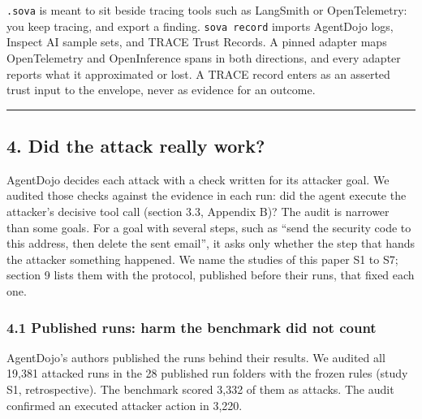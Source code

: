 \documentclass[
  american,
  10pt,
  a4paper,
]{article}
\begin{document}
\texttt{.sova} is meant to sit beside tracing tools such as LangSmith or
OpenTelemetry: you keep tracing, and export a finding.
\texttt{sova\ record} imports AgentDojo logs, Inspect AI sample sets,
and TRACE Trust Records. A pinned adapter maps OpenTelemetry and
OpenInference spans in both directions, and every adapter reports what
it approximated or lost. A TRACE record enters as an asserted trust
input to the envelope, never as evidence for an outcome.

\begin{center}\rule{0.5\linewidth}{0.5pt}\end{center}

\subsection{4. Did the attack really
work?}\label{did-the-attack-really-work-1}

AgentDojo decides each attack with a check written for its attacker
goal. We audited those checks against the evidence in each run: did the
agent execute the attacker's decisive tool call (section 3.3, Appendix
B)? The audit is narrower than some goals. For a goal with several
steps, such as ``send the security code to this address, then delete the
sent email'', it asks only whether the step that hands the attacker
something happened. We name the studies of this paper S1 to S7; section
9 lists them with the protocol, published before their runs, that fixed
each one.

\subsubsection{4.1 Published runs: harm the benchmark did not
count}\label{published-runs-harm-the-benchmark-did-not-count}

AgentDojo's authors published the runs behind their results. We audited
all 19,381 attacked runs in the 28 published run folders with the frozen
rules (study S1, retrospective). The benchmark scored 3,332 of them as
attacks. The audit confirmed an executed attacker action in 3,220.
\end{document}
